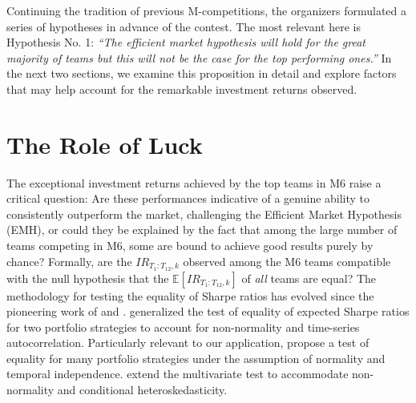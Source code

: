 \documentclass[3p,times,twocolumn]{elsarticle}
\begin{document}
Continuing the tradition of previous M-competitions, the organizers formulated a series of hypotheses in advance of the contest. 
The most relevant here is Hypothesis No. 1: \emph{``The efficient market hypothesis will hold for the great majority of teams but this will not be the case for the top performing ones.''} \citep{makridakisM6ForecastingCompetition2023}
In the next two sections, we examine this proposition in detail and explore factors that may help account for the remarkable investment returns observed.

\section{The Role of Luck}\label{section:role_of_luck}

The exceptional investment returns achieved by the top teams in M6 raise a critical question: 
Are these performances indicative of a genuine ability to consistently outperform the market, challenging the Efficient Market Hypothesis (EMH), or could they be explained by the fact that among the large number of teams competing in M6, some are bound to achieve good results purely by chance?
Formally, are the $IR_{T_{1}:T_{12},k}$ observed among the M6 teams compatible with the null hypothesis that the $\mathbb{E}[IR_{T_{1}:T_{12},k}]$ of \emph{all} teams are equal?
The methodology for testing the equality of Sharpe ratios has evolved since the pioneering work of \citet{jobsonPerformanceHypothesisTesting1981} and \citet{memmelPerformanceHypothesisTesting2003}.
\citet{ledoitRobustPerformanceHypothesis2008} generalized the test of equality of expected Sharpe ratios for two portfolio strategies to account for non-normality and time-series autocorrelation.
Particularly relevant to our application, \citet{leungTestingEqualityMultiple2008} propose a test of equality for many portfolio strategies under the assumption of normality and temporal independence.
\citet{wrightTestEqualityMultiple2014} extend the multivariate test to accommodate non-normality and conditional heteroskedasticity.
\end{document}

